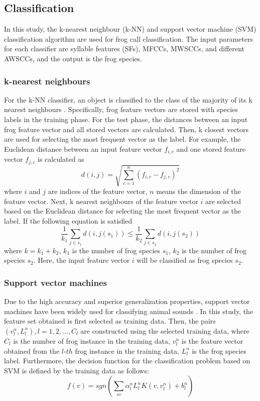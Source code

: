 \subsection{Classification}
In this study, the k-nearest neighbour (k-NN) and support vector machine (SVM) classification algorithm are used for frog call classification. The input parameters for each classifier are syllable features (SFs), MFCCs, MWSCCs, and different AWSCCs, and the output is the frog species.

\subsubsection{k-nearest neighbours}
For the k-NN classifier, an object is classified to the class of the majority of its k nearest neighbours \citep{huang2009frog}. Specifically, frog feature vectors are stored with species labels in the training phase. For the test phase, the distances between an input frog feature vector and all stored vectors are calculated. Then, k closest vectors are used for selecting the most frequent vector as the label. For example, the Euclidean distance between an input feature vector $f_{i,c}$ and one stored feature vector $f_{j,c}$ is calculated as
\begin{equation}
d(i,j) = \sqrt{\sum_{c=1}^{n}(f_{i,c}-f_{j,c})^2}
\end{equation}
\noindent where $i$ and $j$ are indices of the feature vector, $n$ means the dimension of the feature vector. 
Next, k nearest neighbours of the feature vector $i$ are selected based on the Euclidean distance for selecting the most frequent vector as the label. If the following equation is satisfied
\begin{equation}
\frac{1}{k_{1}}\sum_{j \in s_{1}} d(i,j(s_{1})) \leq \frac{1}{k_{2}}\sum_{j \in s_{2}}d(i,j(s_{2})) 
\end{equation}
\noindent where $k=k_{1}+k_{2}$, $k_{1}$ is the number of frog species $s_{1}$, $k_{2}$ is the number of frog species $s_{2}$. Here, the input feature vector $i$ will be classified as frog species $s_{2}$.

\subsubsection{Support vector machines}
Due to the high accuracy and superior generalization properties, support vector machines have been widely used for classifying animal sounds \citep{huang2009frog, acevedo2009automated}. In this study, the feature set obtained is first selected as training data. Then, the pairs $(v_{l}^{n},L_{l}^{n}), l=1,2,..., C_{l}$ are constructed using the selected training data, where $C_{l}$ is the number of frog instance in the training data, $v_{l}^{n}$ is the feature vector obtained from the $l$-$th$ frog instance in the training data, $L_{l}^{n}$ is the frog species label. Furthermore, the decision function for the classification problem based on SVM \citep{cortes1995support} is defined by the training data as follows:
\begin{equation}
f(v) = sgn(\sum_{sv}\alpha_{l}^{n}L_{l}^{n}K(v,v_{l}^{n})+b_{l}^{n})
\end{equation}

